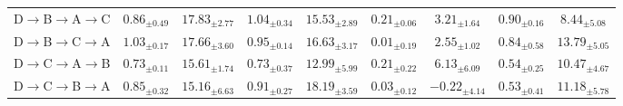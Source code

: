 \begin{table}[!t]
\begin{tabular*}{\textwidth}{@{\extracolsep{\fill}}lcccccccc}
D$\to$B$\to$A$\to$C & $0.86_{\pm0.49}$ & $17.83_{\pm2.77}$ & $1.04_{\pm0.34}$ & $15.53_{\pm2.89}$ & {\boldmath$0.21_{\pm0.06}$} & {\boldmath$3.21_{\pm1.64}$} & $0.90_{\pm0.16}$ & $8.44_{\pm5.08}$ \\
D$\to$B$\to$C$\to$A & $1.03_{\pm0.17}$ & $17.66_{\pm3.60}$ & $0.95_{\pm0.14}$ & $16.63_{\pm3.17}$ & {\boldmath$0.01_{\pm0.19}$} & {\boldmath$2.55_{\pm1.02}$} & $0.84_{\pm0.58}$ & $13.79_{\pm5.05}$ \\
D$\to$C$\to$A$\to$B & $0.73_{\pm0.11}$ & $15.61_{\pm1.74}$ & $0.73_{\pm0.37}$ & $12.99_{\pm5.99}$ & {\boldmath$0.21_{\pm0.22}$} & $6.13_{\pm6.09}$ & $0.54_{\pm0.25}$ & $10.47_{\pm4.67}$ \\
D$\to$C$\to$B$\to$A & $0.85_{\pm0.32}$ & $15.16_{\pm6.63}$ & $0.91_{\pm0.27}$ & $18.19_{\pm3.59}$ & {\boldmath$0.03_{\pm0.12}$} & {\boldmath$-0.22_{\pm4.14}$} & $0.53_{\pm0.41}$ & $11.18_{\pm5.78}$ \\
\bottomrule
\end{tabular*}
\end{table}
